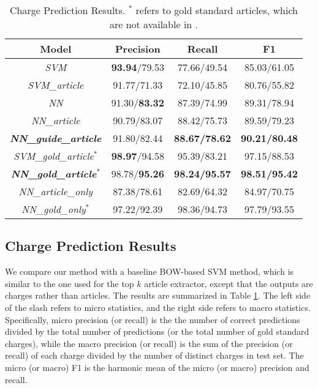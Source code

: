 \begin{table}
\centering
\small{
\begin{tabular}{|c|c|c|c|}
\hline
\textbf{Model}				& \textbf{Precision} 	& \textbf{Recall} 		& \textbf{F1} 	\\
\hline
\textit{SVM} 				& \textbf{93.94}/79.53					& 77.66/49.54  					& 85.03/61.05 				 	\\
\hline
\textit{SVM\_article} 			& 91.77/71.33					& 72.10/45.85  					& 80.76/55.82				 	\\
\hline
\textit{NN}				& 91.30/\textbf{83.32}			& 87.39/74.99  					& 89.31/78.94					\\
\hline
\textit{NN\_article}			& 90.79/83.07					& 88.42/75.73  					& 89.59/79.23					\\
\hline
\textbf{\textit{NN\_guide\_article}} 	& 91.80/82.44 					& \textbf{88.67/78.62} 			& \textbf{90.21/80.48} 		 	\\
\hline
\hline
\textit{SVM\_gold\_article$^*$} 	& \textbf{98.97}/94.58			& 95.39/83.21  					& 97.15/88.53					\\
\hline
\textbf{\textit{NN\_gold\_article$^*$}} 		& 98.78/\textbf{95.26} 			& \textbf{98.24/95.57} 			& \textbf{98.51/95.42} 			\\
\hline
\hline
\textit{NN\_article\_only} 			& 87.38/78.61				& 82.69/64.32				& 84.97/70.75		\\
\hline
\textit{NN\_gold\_only$^*$} 		& 97.22/92.39				& 98.36/94.73				& 97.79/93.55		\\
\hline
\end{tabular}
}
\caption{Charge Prediction Results. $^*$ refers to gold standard articles, which are not available in .}
\label{tabble_main_results}
\end{table}


\subsection{Charge Prediction Results}
\label{sec_main_results}
We compare our method with a baseline BOW-based SVM method, which is similar to the one used for the top $k$ article extractor, except that the outputs are charges rather than articles. The results are summarized in Table \ref{tabble_main_results}. The left side of the slash refers to micro statistics, and the right side refers to macro statistics. Specifically, micro precision (or recall) is the the number of correct predictions divided by the total number of predictions (or the total number of gold standard charges), while the macro precision (or recall) is the sum of the precision (or recall) of each charge divided by the number of distinct charges in test set. The micro (or macro) F1 is the harmonic mean of the micro (or macro) precision and recall.



